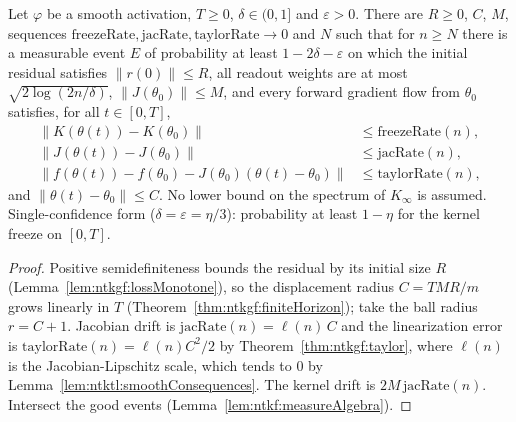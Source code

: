 \begin{theorem}\label{thm:ntktl:finiteHorizonEvent}
  \leanok
Let $\varphi$ be a smooth activation, $T\ge0$, $\delta\in(0,1]$ and $\varepsilon>0$. There are $R\ge0$, $C$, $M$, sequences $\mathrm{freezeRate},\mathrm{jacRate},\mathrm{taylorRate}\to0$ and $N$ such that for $n\ge N$ there is a measurable event $E$ of probability at least $1-2\delta-\varepsilon$ on which the initial residual satisfies $\|r(0)\|\le R$, all readout weights are at most
$\sqrt{2\log(2n/\delta)}$, $\|J(\theta_0)\|\le M$, and every forward gradient flow from $\theta_0$ satisfies, for all $t\in[0,T]$,
\begin{align*}
  \|K(\theta(t))-K(\theta_0)\|&\le\mathrm{freezeRate}(n),\\
  \|J(\theta(t))-J(\theta_0)\|&\le\mathrm{jacRate}(n),\\
  \|f(\theta(t))-f(\theta_0)-J(\theta_0)(\theta(t)-\theta_0)\|&\le\mathrm{taylorRate}(n),
\end{align*}
and $\|\theta(t)-\theta_0\|\le C$. No lower bound on the spectrum of $K_\infty$ is assumed. Single-confidence form ($\delta=\varepsilon=\eta/3$): probability at least $1-\eta$ for the kernel freeze on $[0,T]$.
\end{theorem}

\begin{proof}
  \leanok
Positive semidefiniteness bounds the residual by its initial size $R$ (Lemma~\ref{lem:ntkgf:lossMonotone}), so the displacement radius $C=TMR/m$ grows linearly in $T$ (Theorem~\ref{thm:ntkgf:finiteHorizon}); take the ball radius $r=C+1$. Jacobian drift is $\mathrm{jacRate}(n)=\ell(n)\,C$ and the
linearization error is $\mathrm{taylorRate}(n)=\ell(n)C^2/2$ by Theorem~\ref{thm:ntkgf:taylor}, where $\ell(n)$ is the Jacobian-Lipschitz scale, which tends to $0$ by Lemma~\ref{lem:ntktl:smoothConsequences}. The kernel drift is $2M\,\mathrm{jacRate}(n)$. Intersect the good events (Lemma~\ref{lem:ntkf:measureAlgebra}).
\end{proof}


